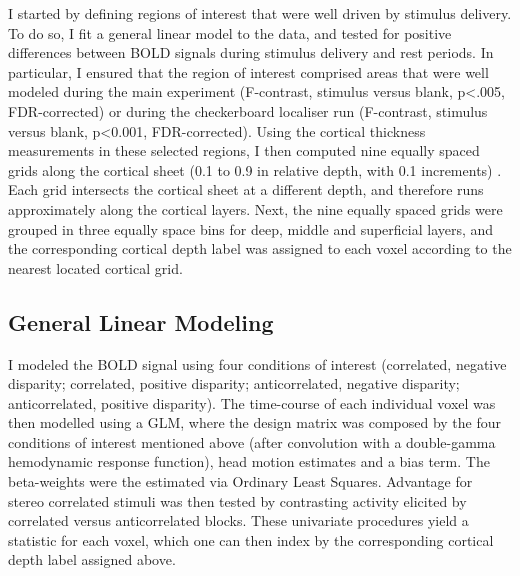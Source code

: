 I started by defining regions of interest that were well driven by stimulus delivery. To do so, I fit a general linear model to the data, and tested for positive differences between BOLD signals during stimulus delivery and rest periods. In particular, I ensured that the region of interest comprised areas that were well modeled during the main experiment (F-contrast, stimulus versus blank, p<.005, FDR-corrected) or during the checkerboard localiser run (F-contrast, stimulus versus blank, p<0.001, FDR-corrected).
Using the cortical thickness measurements in these selected regions, I then computed nine equally spaced grids along the cortical sheet (0.1 to 0.9 in relative depth, with 0.1 increments) \cite{Zimmermann:2011kl}. Each grid intersects the cortical sheet at a different depth, and therefore runs approximately along the cortical layers. Next, the nine equally spaced grids were grouped in three equally space bins for deep, middle and superficial layers, and the corresponding cortical depth label was assigned to each voxel according to the nearest located cortical grid.

\subsection{General Linear Modeling}
I modeled the BOLD signal using four conditions of interest (correlated, negative disparity; correlated, positive disparity; anticorrelated, negative disparity; anticorrelated, positive disparity). The time-course of each individual voxel was then modelled using a GLM, where the design matrix was composed by the four conditions of interest mentioned above (after convolution with a double-gamma hemodynamic response function), head motion estimates and a bias term. The beta-weights were the estimated via Ordinary Least Squares. Advantage for stereo correlated stimuli was then tested by contrasting activity elicited by correlated versus anticorrelated blocks. These univariate procedures yield a statistic for each voxel, which one can then index by the corresponding cortical depth label assigned above.

